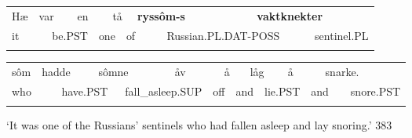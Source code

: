 \begin{tabular}{llllllllllll}
\lsptoprule
Hæ & \multicolumn{2}{l}{var

} & \multicolumn{2}{l}{en

} & \multicolumn{2}{l}{tå

} & \multicolumn{2}{l}{{\bfseries ryssôm-s}

} & \multicolumn{2}{l}{{\bfseries vaktknekter}

} & \\
\multicolumn{2}{l}{it

} & \multicolumn{2}{l}{be.PST

} & \multicolumn{2}{l}{one

} & \multicolumn{2}{l}{of

} & \multicolumn{2}{l}{Russian.PL.DAT-POSS

} & \multicolumn{2}{l}{sentinel.PL

}\\
\lspbottomrule
\end{tabular}

\begin{tabular}{llllllllllllllll}
\lsptoprule
sôm & \multicolumn{2}{l}{hadde

} & \multicolumn{2}{l}{sômne

} & \multicolumn{2}{l}{åv

} & \multicolumn{2}{l}{å

} & \multicolumn{2}{l}{låg

} & \multicolumn{2}{l}{å

} & \multicolumn{2}{l}{snarke.

} & \\
\multicolumn{2}{l}{who

} & \multicolumn{2}{l}{have.PST

} & \multicolumn{2}{l}{fall\_asleep.SUP

} & \multicolumn{2}{l}{off

} & \multicolumn{2}{l}{and

} & \multicolumn{2}{l}{lie.PST

} & \multicolumn{2}{l}{and

} & \multicolumn{2}{l}{snore.PST

}\\
\lspbottomrule
\end{tabular}

\begin{styleTranslation}
 ‘It was one of the Russians’ sentinels who had fallen asleep and lay snoring.’ 383

\end{styleTranslation}

